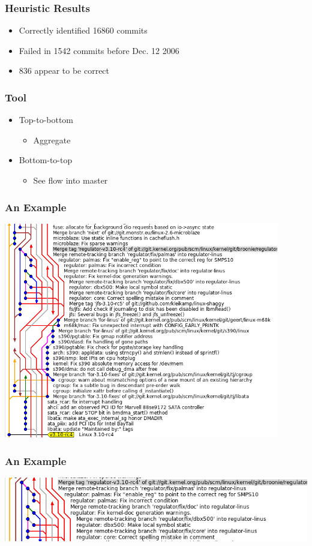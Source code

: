 \documentclass[15pt]{beamer}
\begin{document}
\begin{frame}
  \frametitle{Heuristic Results}
  \begin{itemize}
    \item Correctly identified 16860 commits
    \item Failed in 1542 commits before Dec. 12 2006
    \item 836 appear to be correct
  \end{itemize}
\end{frame}

\begin{frame}
  \frametitle{Tool}
  \begin{itemize}
    \item Top-to-bottom
      \begin{itemize}
        \item Aggregate
      \end{itemize}
    \item Bottom-to-top
      \begin{itemize}
        \item See flow into master
      \end{itemize}
  \end{itemize}
\end{frame}

\begin{frame}
  \frametitle{An Example}
  \begin{center}
    \includegraphics[width=0.9\textwidth]{figures/042dd_DAG.png}
  \end{center}
\end{frame}

\begin{frame}
  \frametitle{An Example}
  \begin{center}
    \includegraphics[width=\textwidth]{figures/042d/042dd_DAG_focus.png}
  \end{center}
\end{frame}
\end{document}
